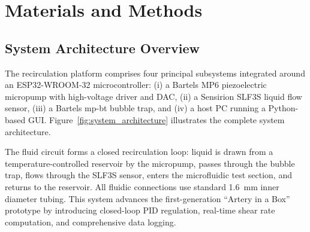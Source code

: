 
\chapter{Materials and Methods}
\label{ch:methods}

\ifpdf
    \graphicspath{{Chapter2/Figs/Raster/}{Chapter2/Figs/PDF/}{Chapter2/Figs/}}
\else
    \graphicspath{{Chapter2/Figs/Vector/}{Chapter2/Figs/}}
\fi

\section{System Architecture Overview}

The recirculation platform comprises four principal subsystems integrated around an ESP32-WROOM-32 microcontroller: (i) a Bartels MP6 piezoelectric micropump with high-voltage driver and DAC, (ii) a Sensirion SLF3S liquid flow sensor, (iii) a Bartels mp-bt bubble trap, and (iv) a host PC running a Python-based GUI. Figure~\ref{fig:system_architecture} illustrates the complete system architecture.


The fluid circuit forms a closed recirculation loop: liquid is drawn from a temperature-controlled reservoir by the micropump, passes through the bubble trap, flows through the SLF3S sensor, enters the microfluidic test section, and returns to the reservoir. All fluidic connections use standard \SI{1.6}{\milli\metre} inner diameter tubing. This system advances the first-generation ``Artery in a Box'' prototype \citep{Kacerik2024} by introducing closed-loop PID regulation, real-time shear rate computation, and comprehensive data logging.


